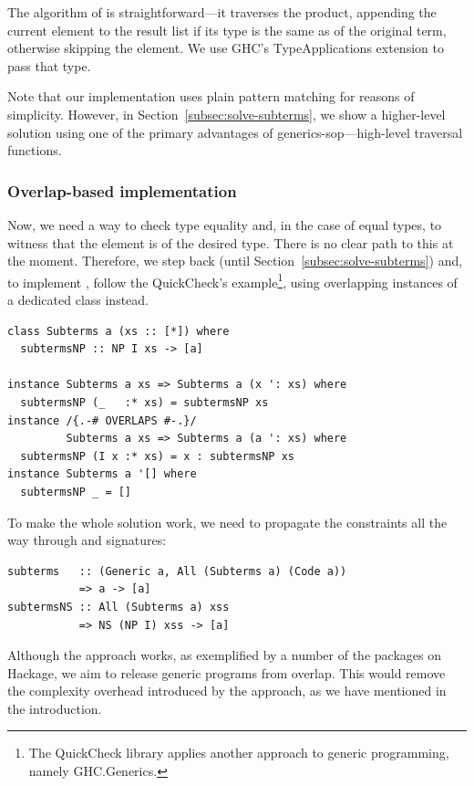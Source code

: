 \documentclass[sigplan,screen,review,anonymous]{acmart}
\begin{document}
The algorithm of  is straightforward---it traverses the product, appending the current element to the result list if its type is the same as of the original term, otherwise skipping the element. We use GHC's \textsf{TypeApplications} extension to pass that type.

Note that our implementation uses plain pattern matching for reasons of simplicity. However, in Section~\ref{subsec:solve-subterms}, we show a higher-level solution using one of the primary advantages of \textsf{generics-sop}---high-level traversal functions.

\subsubsection{Overlap-based implementation}

Now, we need a way to check type equality and, in the case of equal types, to witness that the element is of the desired type. There is no clear path to this at the moment. Therefore, we step back (until Section~\ref{subsec:solve-subterms}) and, to implement , follow the \textsf{QuickCheck}'s example\footnote{The \textsf{QuickCheck} library applies another approach to generic programming, namely \textsf{GHC.Generics}.}, using overlapping instances of a dedicated class instead.
\begin{lstlisting}[style=fancy]
class Subterms a (xs :: [*]) where
  subtermsNP :: NP I xs -> [a]

instance Subterms a xs => Subterms a (x ': xs) where
  subtermsNP (_   :* xs) = subtermsNP xs
instance /{.-# OVERLAPS #-.}/
         Subterms a xs => Subterms a (a ': xs) where
  subtermsNP (I x :* xs) = x : subtermsNP xs
instance Subterms a '[] where
  subtermsNP _ = []
\end{lstlisting}

To make the whole solution work, we need to propagate the constraints all the way through  and  signatures:
\begin{lstlisting}[style=fancy]
subterms   :: (Generic a, All (Subterms a) (Code a))
           => a -> [a]
subtermsNS :: All (Subterms a) xss
           => NS (NP I) xss -> [a]
\end{lstlisting}

Although the approach works, as exemplified by a number of the packages on Hackage, we aim to release generic programs from overlap. This would remove the complexity overhead introduced by the approach, as we have mentioned in the introduction.
\end{document}
